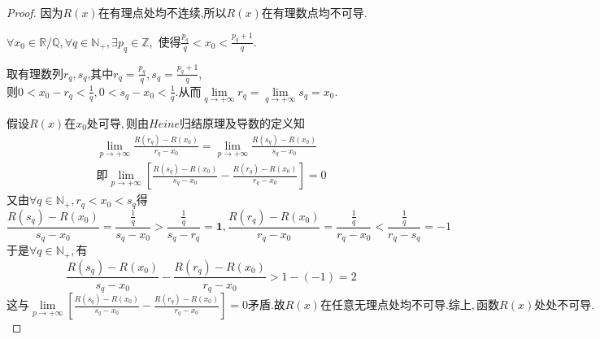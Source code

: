 \documentclass[lang=cn,newtx,10pt,scheme=chinese]{../Template/elegantbook}
\begin{document}
\begin{proof}
因为$R(x)$在有理点处均不连续,所以$R(x)$在有理数点均不可导.

$\forall x_0\in \mathbb{R} /\mathbb{Q} ,\forall q\in \mathbb{N} _+,\exists p_q\in \mathbb{Z} ,$
使得$\frac{p_q}{q}<x_0<\frac{p_q+1}{q}$.

取有理数列${r_q},{s_q}$,其中$r_q=\frac{p_q}{q},s_q=\frac{p_q+1}{q}$,
$
\text{则}0<x_0-r_q<\frac{1}{q},0<s_q-x_0<\frac{1}{q}.\text{从而}\underset{q\rightarrow +\infty}{\lim}r_q=\underset{q\rightarrow +\infty}{\lim}s_q=x_0.
$

$
\text{假设}R\left( x \right) \text{在}x_0\text{处可导},\text{则由}Heine\text{归结原理及导数的定义知}
$
\begin{equation}
\begin{split}
\underset{p\rightarrow +\infty}{\lim}\frac{R\left( r_q \right) -R\left( x_0 \right)}{r_q-x_0}=\underset{p\rightarrow +\infty}{\lim}\frac{R\left( s_q \right) -R\left( x_0 \right)}{s_q-x_0}
\\
\text{即}\underset{p\rightarrow +\infty}{\lim}\left[ \frac{R\left( s_q \right) -R\left( x_0 \right)}{s_q-x_0}-\frac{R\left( r_q \right) -R\left( x_0 \right)}{r_q-x_0} \right] =0
\end{split}
\nonumber
\end{equation}
$
\text{又由}\forall q\in \mathbb{N} _+,r_q<x_0<s_q\text{得}
$
\begin{equation}
\frac{R\left( s_q \right) -R\left( x_0 \right)}{s_q-x_0}=\frac{\frac{1}{q}}{s_q-x_0}>\frac{\frac{1}{q}}{s_q-r_q}=\mathbf{1},\frac{R\left( r_q \right) -R\left( x_0 \right)}{r_q-x_0}=\frac{\frac{1}{q}}{r_q-x_0}<\frac{\frac{1}{q}}{r_q-s_q}=-1
\nonumber
\end{equation}
$
\text{于是}\forall q\in \mathbb{N} _+,\text{有}
$
\begin{equation}
\frac{R\left( s_q \right) -R\left( x_0 \right)}{s_q-x_0}-\frac{R\left( r_q \right) -R\left( x_0 \right)}{r_q-x_0}>1-\left( -1 \right) =2
\nonumber
\end{equation}
$
\text{这与}\underset{p\rightarrow +\infty}{\lim}\left[ \frac{R\left( s_q \right) -R\left( x_0 \right)}{s_q-x_0}-\frac{R\left( r_q \right) -R\left( x_0 \right)}{r_q-x_0} \right] =0\text{矛盾}.
\text{故}R\left( x \right) \text{在任意无理点处均不可导}.
\text{综上},\text{函数}R\left( x \right) \text{处处不可导}.
$


\end{proof}
\end{document}
